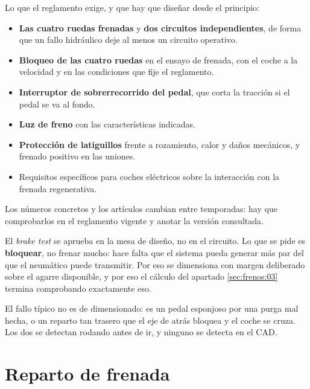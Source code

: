 \begin{regla}[frenos]
Lo que el reglamento exige, y que hay que diseñar desde el principio:

\begin{itemize}
  \item \textbf{Las cuatro ruedas frenadas} y \textbf{dos circuitos
        independientes}, de forma que un fallo hidráulico deje al menos un
        circuito operativo.
  \item \textbf{Bloqueo de las cuatro ruedas} en el ensayo de frenada, con el
        coche a la velocidad y en las condiciones que fije el reglamento.
  \item \textbf{Interruptor de sobrerrecorrido del pedal}, que corta la
        tracción si el pedal se va al fondo.
  \item \textbf{Luz de freno} con las características indicadas.
  \item \textbf{Protección de latiguillos} frente a rozamiento, calor y daños
        mecánicos, y frenado positivo en las uniones.
  \item Requisitos específicos para coches eléctricos sobre la interacción con
        la frenada regenerativa.
\end{itemize}

Los números concretos y los artículos cambian entre temporadas: hay que
comprobarlos en el reglamento vigente y anotar la versión consultada.
\end{regla}

\begin{clave}
El \emph{brake test} se aprueba en la mesa de diseño, no en el circuito. Lo que
se pide es \textbf{bloquear}, no frenar mucho: hace falta que el sistema pueda
generar más par del que el neumático puede transmitir. Por eso se dimensiona con
margen deliberado sobre el agarre disponible, y por eso el cálculo del apartado
\ref{sec:frenos:03} termina comprobando exactamente eso.

El fallo típico no es de dimensionado: es un pedal esponjoso por una purga mal
hecha, o un reparto tan trasero que el eje de atrás bloquea y el coche se
cruza. Los dos se detectan rodando antes de ir, y ninguno se detecta en el CAD.
\end{clave}

\section{Reparto de frenada}
\label{sec:frenos:02}

